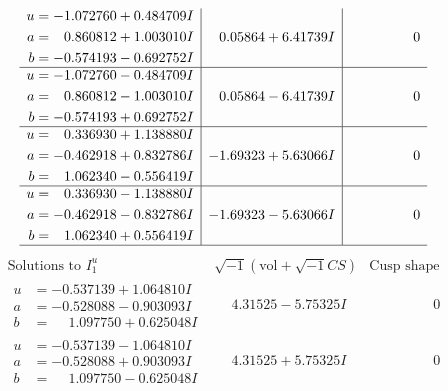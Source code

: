 \documentclass[1p]{elsarticle_modified}
\theoremstyle{definition}
\newcommand{\I}{\sqrt{-1}}
\begin{document}
$$\begin{array}{c|c|c}
\begin{aligned}
u &= -1.072760 + 0.484709 I \\
a &= \phantom{-}0.860812 + 1.003010 I \\
b &= -0.574193 - 0.692752 I\end{aligned}
 & \phantom{-}0.05864 + 6.41739 I & \phantom{-0.000000 } 0 \\ \hline\begin{aligned}
u &= -1.072760 - 0.484709 I \\
a &= \phantom{-}0.860812 - 1.003010 I \\
b &= -0.574193 + 0.692752 I\end{aligned}
 & \phantom{-}0.05864 - 6.41739 I & \phantom{-0.000000 } 0 \\ \hline\begin{aligned}
u &= \phantom{-}0.336930 + 1.138880 I \\
a &= -0.462918 + 0.832786 I \\
b &= \phantom{-}1.062340 - 0.556419 I\end{aligned}
 & -1.69323 + 5.63066 I & \phantom{-0.000000 } 0 \\ \hline\begin{aligned}
u &= \phantom{-}0.336930 - 1.138880 I \\
a &= -0.462918 - 0.832786 I \\
b &= \phantom{-}1.062340 + 0.556419 I\end{aligned}
 & -1.69323 - 5.63066 I & \phantom{-0.000000 } 0\\
 \hline 
 \end{array}$$\newpage$$\begin{array}{c|c|c}  
\text{Solutions to }I^u_{1}& \I (\text{vol} + \sqrt{-1}CS) & \text{Cusp shape}\\
 \hline 
\begin{aligned}
u &= -0.537139 + 1.064810 I \\
a &= -0.528088 - 0.903093 I \\
b &= \phantom{-}1.097750 + 0.625048 I\end{aligned}
 & \phantom{-}4.31525 - 5.75325 I & \phantom{-0.000000 } 0 \\ \hline\begin{aligned}
u &= -0.537139 - 1.064810 I \\
a &= -0.528088 + 0.903093 I \\
b &= \phantom{-}1.097750 - 0.625048 I\end{aligned}
 & \phantom{-}4.31525 + 5.75325 I & \phantom{-0.000000 } 0 \\ \hline\begin{aligned}

\end{aligned}
\end{array}$$
\end{document}
